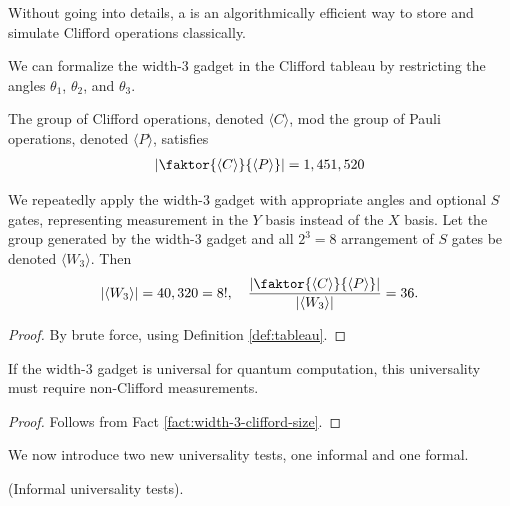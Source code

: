 \begin{definition}
\label{def:tableau}
Without going into details, a  \cite{tableau-original} is an algorithmically efficient way to store and simulate Clifford operations classically.
\end{definition}

We can formalize the width-3 gadget in the Clifford tableau by restricting the angles $\theta_1$, $\theta_2$, and $\theta_3$. 

\begin{fact}
The group of Clifford operations, denoted $\langle C \rangle$, mod the group of Pauli operations, denoted $\langle P \rangle$, satisfies
\begin{align}
    \left| \faktor{\langle C \rangle}{\langle P \rangle} \right| = 1,451,520
\end{align}
\end{fact}

\begin{fact}
\label{fact:width-3-clifford-size}
We repeatedly apply the width-3 gadget with appropriate angles and optional $S$ gates, representing measurement in the $Y$ basis instead of the $X$ basis. Let the group generated by the width-3 gadget and all $2^3 = 8$ arrangement of $S$ gates be denoted $\langle W_3 \rangle$. Then 
\begin{align}
    | \langle W_3 \rangle | = 40,320 = 8!, \quad
    \frac{\left| \faktor{\langle C \rangle}{\langle P \rangle} \right|}
    {| \langle W_3 \rangle |} = 36.
\end{align}
\begin{proof}
By brute force, using Definition \ref{def:tableau}.
\end{proof}
\end{fact}

\begin{theorem}
If the width-3 gadget is universal for quantum computation, this universality must require non-Clifford measurements.
\begin{proof}
Follows from Fact \ref{fact:width-3-clifford-size}.
\end{proof}
\end{theorem}

We now introduce two new universality tests, one informal and one formal.

\begin{definition}
(Informal universality tests). 
\end{definition}

